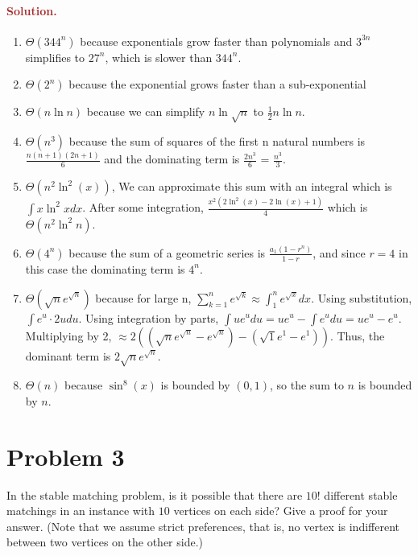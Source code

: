 \paragraph{\textcolor{brown}{Solution.}}
\begin{enumerate}
    \item $\Theta(344^n)$ because exponentials grow faster than polynomials and $3^{3n}$ simplifies to $27^n$, which is slower than $344^n$.
    \item $\Theta(2^n)$ because the exponential grows faster than a sub-exponential 
    \item $\Theta(n \ln n)$ because we can simplify $n \ln \sqrt{n}$ to $\frac{1}{2} n \ln n$.
    \item $\Theta(n^3)$ because the sum of squares of the first n natural numbers is $\frac{n(n+1)(2n+1)}{6}$ and the dominating term is $\frac{2n^3}{6}$ = $\frac{n^3}{3}$.
    \item $\Theta(n^2 \ln^2(x))$, We can approximate this sum with an integral which is $\int x \ln^2 x dx$. After some integration, $\frac{x^2(2\ln^2(x) - 2\ln(x) +1)}{4}$ which is $\Theta(n^2 \ln^2 n)$.
    \item $\Theta(4^n)$ because the sum of a geometric series is $\frac{a_1(1-r^n)}{1-r}$, and since $r = 4$ in this case the dominating term is $4^n$.
    \item $\Theta(\sqrt{n}e^{\sqrt{n}})$ because for large n, $\sum_{k = 1}^{n} e^{\sqrt{k}} \approx \int_{1}^{n} e^{\sqrt{x}}dx$. Using substitution, $\int e^u \cdot 2u du$. Using integration by parts, $\int ue^u du = ue^u - \int e^u du = ue^u - e^u$. Multiplying by 2, $\approx 2((\sqrt{n}e^{\sqrt{n}} - e^{\sqrt{n}}) - (\sqrt{1}e^1 - e^1))$. Thus, the dominant term is $2\sqrt{n}e^{\sqrt{n}}$. 
    \item $\Theta(n)$ because $\sin^8(x)$ is bounded by $(0,1)$, so the sum to $n$ is bounded by $n$.
\end{enumerate}

\section*{Problem 3}
In the stable matching problem, is it possible that there are $10!$ different stable matchings in an instance with $10$ vertices on each side? Give a proof for your answer. (Note that we assume strict preferences, that is, no vertex is indifferent between two vertices on the other side.)

